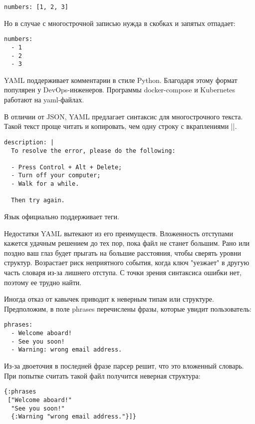 \begin{verbatim}
numbers: [1, 2, 3]
\end{verbatim}

Но в случае с многострочной записью нужда в скобках и запятых отпадает:

\begin{verbatim}
numbers:
  - 1
  - 2
  - 3
\end{verbatim}

YAML поддерживает комментарии в стиле Python. Благодаря этому формат популярен у
DevOps-инженеров. Программы docker-compose и Kubernetes работают на yaml-файлах.

В отличии от JSON, YAML предлагает синтаксис для многострочного текста. Такой
текст проще читать и копировать, чем одну строку с вкраплениями \spverb|\n|.

\begin{verbatim}
description: |
  To resolve the error, please do the following:

  - Press Control + Alt + Delete;
  - Turn off your computer;
  - Walk for a while.

  Then try again.
\end{verbatim}

Язык официально поддерживает теги.

Недостатки YAML вытекают из его преимуществ. Вложенность отступами кажется
удачным решением до тех пор, пока файл не станет большим. Рано или поздно ваш
глаз будет прыгать на большие расстояния, чтобы сверять уровни
структур. Возрастает риск неприятного события, когда ключ "уезжает" в другую
часть словаря из-за лишнего отступа. С точки зрения синтаксиса ошибки нет,
поэтому ее трудно найти.

Иногда отказ от кавычек приводит к неверным типам или структуре. Предположим, в
поле phrases перечислены фразы, которые увидит пользователь:

\begin{verbatim}
phrases:
  - Welcome aboard!
  - See you soon!
  - Warning: wrong email address.
\end{verbatim}

Из-за двоеточия в последней фразе парсер решит, что это вложенный словарь. При
попытке считать такой файл получится неверная структура:

\begin{verbatim}
{:phrases
 ["Welcome aboard!"
  "See you soon!"
  {:Warning "wrong email address."}]}
\end{verbatim}

